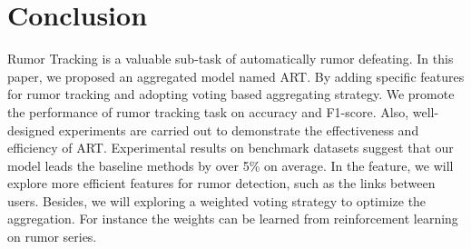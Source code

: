 \section{Conclusion}
\label{sec:conclusion}
Rumor Tracking is a valuable sub-task of automatically rumor defeating. In this paper, we proposed an aggregated model named ART.  By adding specific features for rumor tracking and adopting voting based aggregating strategy. We promote the performance of rumor tracking task on accuracy and F1-score. Also, well-designed experiments are carried out to demonstrate the effectiveness and efficiency of ART. Experimental results on benchmark datasets suggest that our model leads the baseline methods by over 5\% on average. In the feature, we will explore more efficient features for rumor detection, such as the links between users. Besides, we will exploring a weighted voting strategy to optimize the aggregation. For instance the weights can be learned from reinforcement learning on rumor series.